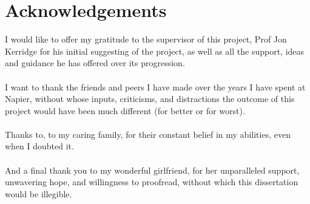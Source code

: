 \newpage
\section*{Acknowledgements}
	\noindent
	I would like to offer my gratitude to the supervisor of this project, Prof Jon Kerridge for his initial suggesting of the project, as well as all the support, ideas and guidance he has offered over its progression.
	\\\\
	I want to thank the friends and peers I have made over the years I have spent at Napier, without whose inputs, criticisms, and distractions the outcome of this project would have been much different (for better or for worst).
	\\\\
	Thanks to, to my caring family, for their constant belief in my abilities, even when I doubted it.
	\\\\
	And a final thank you to my wonderful girlfriend, for her unparalleled support, unwavering hope, and willingness to proofread, without which this dissertation would be illegible.
	\newpage
